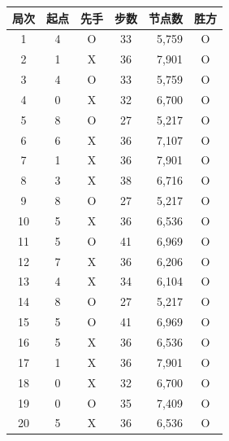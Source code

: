 \begin{tabular}{ccccrc}
\toprule
局次 & 起点 & 先手 & 步数 & 节点数 & 胜方 \\
\midrule
1 & 4 & O & 33 & 5,759 & O \\
2 & 1 & X & 36 & 7,901 & O \\
3 & 4 & O & 33 & 5,759 & O \\
4 & 0 & X & 32 & 6,700 & O \\
5 & 8 & O & 27 & 5,217 & O \\
6 & 6 & X & 36 & 7,107 & O \\
7 & 1 & X & 36 & 7,901 & O \\
8 & 3 & X & 38 & 6,716 & O \\
9 & 8 & O & 27 & 5,217 & O \\
10 & 5 & X & 36 & 6,536 & O \\
11 & 5 & O & 41 & 6,969 & O \\
12 & 7 & X & 36 & 6,206 & O \\
13 & 4 & X & 34 & 6,104 & O \\
14 & 8 & O & 27 & 5,217 & O \\
15 & 5 & O & 41 & 6,969 & O \\
16 & 5 & X & 36 & 6,536 & O \\
17 & 1 & X & 36 & 7,901 & O \\
18 & 0 & X & 32 & 6,700 & O \\
19 & 0 & O & 35 & 7,409 & O \\
20 & 5 & X & 36 & 6,536 & O \\
\bottomrule
\end{tabular}
